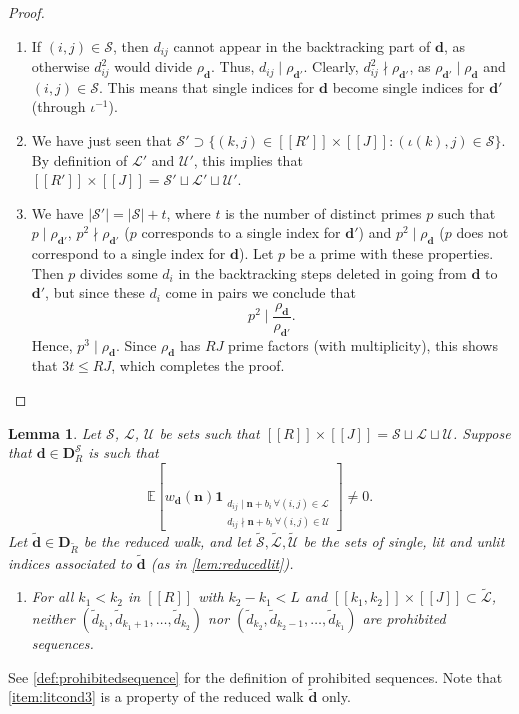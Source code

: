 \documentclass[11pt]{amsart}
\newtheorem{lemma}[theorem]{Lemma}
\theoremstyle{definition}
\renewcommand{\leq}{\leqslant}
\newcommand{\interval}[2]{[\![#1,#2]\!] }
\newcommand{\sinterval}[1]{[\![#1]\!] }
\newcommand{\abs}[1]{\left|#1\right|}
\newcommand{\ind}[1]{\mathbf{1}_{#1}}
\newcommand{\E}{\mathbb{E}}
\renewcommand{\d}{\boldsymbol{d}}
\newcommand{\pcomp}[2]{d_{#1#2}}
\newcommand{\n}{\mathbf{n}}
\newcommand{\sommespart}{b}
\newcommand{\fprod}[1]{\rho_{#1}}
\newcommand{\pall}{\fprod{\d}}
\newcommand{\pallprime}{\fprod{\d'}}
\newcommand{\lit}{\mathcal{L}}
\newcommand{\unlit}{\mathcal{U}}
\newcommand{\s}{\mathcal{S}}
\newcommand{\fancyD}{\mathbf{D}}
\newcommand{\Dsfmix}[1]{\fancyD_{\!#1}}
\newcommand{\DsR}{\fancyD^{\s}_{\!\tupsize}}
\newcommand{\elln}{L}
\newcommand{\repR}{J}
\newcommand{\newR}{\sinterval{J}}
\newcommand{\redd}{\widetilde{d}}
\newcommand{\Redd}{\widetilde{\d}}
\newcommand{\reduceds}{\widetilde{\s}}
\newcommand{\reducedlit}{\widetilde{\lit}}
\newcommand{\reducedunlit}{\widetilde{\unlit}}
\newcommand{\newerKRR}{\sinterval{\tupsize}\times\newR}
\newcommand{\tupsize}{R}
\newcommand{\myfunction}{\iota}
\begin{document}
\begin{proof}
\begin{enumerate}
	\item If $(i,j)\in \s$, then $\pcomp{i}{j}$ cannot appear in the backtracking part of $\d$, as otherwise $\pcomp{i}{j}^2$ would divide $\pall$. Thus, $\pcomp{i}{j} \mid \pallprime$. Clearly, $\pcomp{i}{j}^2 \nmid \pallprime$, as $\pallprime \mid \pall$ and $(i,j)\in \s$. This means that single indices for $\d$ become single indices for $\d'$ (through $\myfunction^{-1}$).
	\item We have just seen that $\s' \supset \{(k,j)\in \sinterval{\tupsize'} \times \newR : (\myfunction(k), j)\in \s\}$. By definition of $\lit'$ and $\unlit'$, this implies that $\sinterval{\tupsize'} \times \newR = \s' \sqcup \lit'\sqcup \unlit'$. 
	\item We have $\abs{\s'} = \abs{\s} + t$, where $t$ is the number of distinct primes $p$ such that $p\mid \pallprime$, $p^2 \nmid \pallprime$ ($p$ corresponds to a single index for $\d'$) and $p^2\mid \pall$ ($p$ does not correspond to a single index for $\d$). Let $p$ be a prime with these properties. Then $p$ divides some $d_i$ in the backtracking steps deleted in going from $\d$ to $\d'$, but since these $d_i$ come in pairs we conclude that 
	\begin{equation*}
		p^2 \mid \frac{\pall}{\pallprime}.
	\end{equation*}	
	Hence, $p^3 \mid \pall$. Since $\pall$ has $\tupsize\repR$ prime factors (with multiplicity), this shows that $3t\leq \tupsize\repR$, which completes the proof.\qedhere
\end{enumerate}
\end{proof}


\begin{lemma}
\label{lem:litcondreduced}
Let $\s$, $\lit$, $\unlit$ be sets such that $\newerKRR = \s\sqcup\lit\sqcup\unlit$. Suppose that $\d\in \DsR$ is such that
\begin{equation}
\label{eq:expectnonzeroreduced}
	\E \left[w_{\d}(\n) \ind{\substack{\pcomp{i}{j}\mid \n+\sommespart_i \, \forall (i,j)\in \lit \\ \pcomp{i}{j}\nmid \n+\sommespart_i \, \forall (i,j)\in \unlit}} \right] \neq 0.
\end{equation}
Let $\Redd \in \Dsfmix{\widetilde{\tupsize}}$ be the reduced walk, and let $\reduceds,\reducedlit,\reducedunlit$ be the sets of single, lit and unlit indices associated to $\Redd$ (as in \cref{lem:reducedlit}).
\begin{enumerate}
	\setcounter{enumi}{\numexpr3-1\relax}
	\item \label{item:litcond3} 
	For all $k_1 < k_2$ in $\sinterval{\tupsize}$ with $k_2-k_1 < \elln$ and $\interval{k_1}{k_2} \times \newR \subset \reducedlit$, neither $(\redd_{k_1}, \redd_{k_1+1}, \ldots, \redd_{k_2})$ nor $(\redd_{k_2}, \redd_{k_2-1}, \ldots, \redd_{k_1})$ are prohibited sequences.
\end{enumerate}
\end{lemma}
See \cref{def:prohibitedsequence} for the definition of prohibited sequences. Note that \cref{item:litcond3} is a property of the reduced walk $\Redd$ only.
\end{document}
